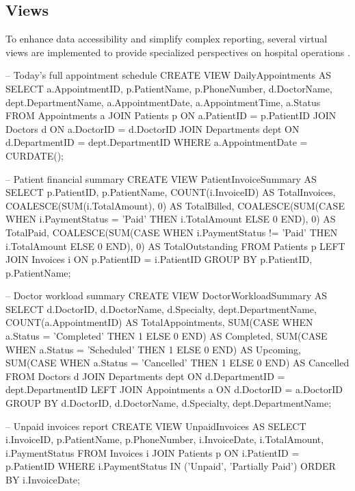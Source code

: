 \subsection{Views}
To enhance data accessibility and simplify complex reporting, several virtual views are implemented to provide specialized perspectives on hospital operations \cite{mysql_stored_programs}.

\begin{sqlcode}
-- Today's full appointment schedule
CREATE VIEW DailyAppointments AS
SELECT
    a.AppointmentID,
    p.PatientName,
    p.PhoneNumber,
    d.DoctorName,
    dept.DepartmentName,
    a.AppointmentDate,
    a.AppointmentTime,
    a.Status
FROM Appointments a
JOIN Patients p ON a.PatientID = p.PatientID
JOIN Doctors d ON a.DoctorID = d.DoctorID
JOIN Departments dept ON d.DepartmentID = dept.DepartmentID
WHERE a.AppointmentDate = CURDATE();

-- Patient financial summary
CREATE VIEW PatientInvoiceSummary AS
SELECT
    p.PatientID,
    p.PatientName,
    COUNT(i.InvoiceID) AS TotalInvoices,
    COALESCE(SUM(i.TotalAmount), 0) AS TotalBilled,
    COALESCE(SUM(CASE WHEN i.PaymentStatus = 'Paid' THEN i.TotalAmount ELSE 0 END), 0) AS TotalPaid,
    COALESCE(SUM(CASE WHEN i.PaymentStatus != 'Paid' THEN i.TotalAmount ELSE 0 END), 0) AS TotalOutstanding
FROM Patients p
LEFT JOIN Invoices i ON p.PatientID = i.PatientID
GROUP BY p.PatientID, p.PatientName;

-- Doctor workload summary
CREATE VIEW DoctorWorkloadSummary AS
SELECT
    d.DoctorID,
    d.DoctorName,
    d.Specialty,
    dept.DepartmentName,
    COUNT(a.AppointmentID) AS TotalAppointments,
    SUM(CASE WHEN a.Status = 'Completed' THEN 1 ELSE 0 END) AS Completed,
    SUM(CASE WHEN a.Status = 'Scheduled' THEN 1 ELSE 0 END) AS Upcoming,
    SUM(CASE WHEN a.Status = 'Cancelled' THEN 1 ELSE 0 END) AS Cancelled
FROM Doctors d
JOIN Departments dept ON d.DepartmentID = dept.DepartmentID
LEFT JOIN Appointments a ON d.DoctorID  = a.DoctorID
GROUP BY d.DoctorID, d.DoctorName, d.Specialty, dept.DepartmentName;

-- Unpaid invoices report
CREATE VIEW UnpaidInvoices AS
SELECT
    i.InvoiceID,
    p.PatientName,
    p.PhoneNumber,
    i.InvoiceDate,
    i.TotalAmount,
    i.PaymentStatus
FROM Invoices i
JOIN Patients p ON i.PatientID = p.PatientID
WHERE i.PaymentStatus IN ('Unpaid', 'Partially Paid')
ORDER BY i.InvoiceDate;
\end{sqlcode}

